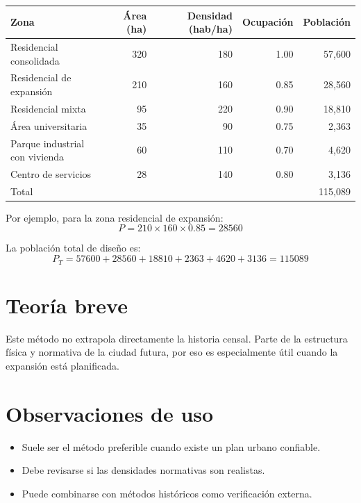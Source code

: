 \documentclass[12pt]{article}
\begin{document}
\begin{center}
\begin{tabular}{lrrrr}
\toprule
Zona & Área (ha) & Densidad (hab/ha) & Ocupación & Población \\
\midrule
Residencial consolidada & 320 & 180 & 1.00 & 57,600 \\
Residencial de expansión & 210 & 160 & 0.85 & 28,560 \\
Residencial mixta & 95 & 220 & 0.90 & 18,810 \\
Área universitaria & 35 & 90 & 0.75 & 2,363 \\
\makecell[l]{Parque industrial\\con vivienda} & 60 & 110 & 0.70 & 4,620 \\
Centro de servicios & 28 & 140 & 0.80 & 3,136 \\
\midrule
Total & & & & 115,089 \\
\bottomrule
\end{tabular}
\end{center}

Por ejemplo, para la zona residencial de expansión:
\[
P = 210 \times 160 \times 0.85 = \num{28560}
\]

La población total de diseño es:
\[
P_T = \num{57600}+\num{28560}+\num{18810}+\num{2363}+\num{4620}+\num{3136}=\num{115089}
\]


\section{Teoría breve}
Este método no extrapola directamente la historia censal. Parte de la estructura física y normativa de la ciudad futura, por eso es especialmente útil cuando la expansión está planificada.

\section{Observaciones de uso}
\begin{itemize}
\item Suele ser el método preferible cuando existe un plan urbano confiable.
\item Debe revisarse si las densidades normativas son realistas.
\item Puede combinarse con métodos históricos como verificación externa.
\end{itemize}
\end{document}

